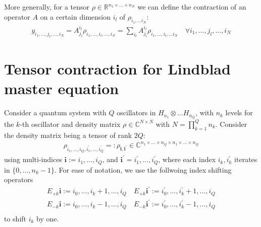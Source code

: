 \documentclass[letterpaper]{article}
\newcommand{\R}{\mathds{R}}
\newcommand{\C}{\mathds{C}}
\newcommand{\bfi}{\boldsymbol{i}}
\newcommand{\p}{\prime}
\begin{document}
More generally, for a tensor $\rho \in \R^{n_1\times \dots \times n_N}$ we can define the contraction of an operator $A$ on a certain dimension $i_l$ of $\rho_{i_1,\dots i_N}$:
\begin{align}
    y_{i_1,\dots,j_l,\dots,i_N} = A_{j_l}^{i_l} \rho_{i_1,\dots,i_l,\dots,i_N} = \sum_{i_l} A_{j_l}^{i_l} \rho_{i_1,\dots,i_l,\dots i_N} \quad \forall i_1,\dots, j_l,\dots,i_N
\end{align}



\section{Tensor contraction for Lindblad master equation}
Consider a quantum system with $Q$ oscillators in $H_{n_1} \otimes \dots H_{n_Q}$, with $n_k$ levels for the $k$-th oscillator and density matrix $\rho \in \C^{N\times N}$ with $N=\prod_{k=1}^{Q} n_k$. Consider the density matrix being a tensor of rank $2Q$: 
\begin{align}
    \rho_{i_1,\dots, i_Q, i_1^{\prime}, \dots, i_Q^{\prime}} =: \rho_{\bfi, \bfi^\prime}\in\C^{n_1\times \dots \times n_Q \times n_1 \times \dots \times n_Q}
\end{align}
using multi-indices $\bfi := i_{1},\dots,i_{Q}$, and $\bfi^\prime = i_1^\prime, \dots, i_Q^\prime$, where each index $i_k, i_k^\p$ iterates in $\{0,\dots,n_k-1\}$. For ease of notation, we use the follwoing index shifting operators 
\begin{align}
  E_{+k} \bfi := i_0,\dots, i_{k}+1, \dots, i_Q \quad E_{+k} \bfi^\prime := i_0^\prime, \dots, i_k^\prime + 1, \dots, i_Q\\
  E_{-k} \bfi := i_0,\dots, i_{k}-1, \dots, i_Q \quad E_{-k} \bfi^\prime := i_0^\prime, \dots, i_k^\prime - 1, \dots, i_Q\\
\end{align}
to shift $i_k$ by one. 
\end{document}

